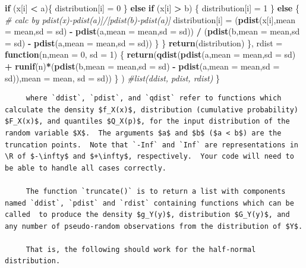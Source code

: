 \documentclass[
  9pt,
]{article}
\newenvironment{Shaded}{\begin{snugshade}}{\end{snugshade}}
\newcommand{\CommentTok}[1]{\textcolor[rgb]{0.56,0.35,0.01}{\textit{#1}}}
\newcommand{\ControlFlowTok}[1]{\textcolor[rgb]{0.13,0.29,0.53}{\textbf{#1}}}
\newcommand{\DataTypeTok}[1]{\textcolor[rgb]{0.13,0.29,0.53}{#1}}
\newcommand{\DecValTok}[1]{\textcolor[rgb]{0.00,0.00,0.81}{#1}}
\newcommand{\KeywordTok}[1]{\textcolor[rgb]{0.13,0.29,0.53}{\textbf{#1}}}
\newcommand{\NormalTok}[1]{#1}
\newcommand{\OperatorTok}[1]{\textcolor[rgb]{0.81,0.36,0.00}{\textbf{#1}}}
\newcommand{\StringTok}[1]{\textcolor[rgb]{0.31,0.60,0.02}{#1}}
\newcommand*{\R}{\textsf{R}$~$}
\begin{document}
\begin{Shaded}
\begin{Highlighting}[]
          \ControlFlowTok{if}\NormalTok{ (x[i] }\OperatorTok{<}\StringTok{ }\NormalTok{a)\{}
\NormalTok{            distribution[i] =}\StringTok{ }\DecValTok{0}
\NormalTok{          \} }\ControlFlowTok{else} \ControlFlowTok{if}\NormalTok{ (x[i] }\OperatorTok{>}\StringTok{ }\NormalTok{b) \{}
\NormalTok{            distribution[i] =}\StringTok{ }\DecValTok{1}
\NormalTok{          \}}
          \ControlFlowTok{else}\NormalTok{ \{}
            \CommentTok{\# calc by pdist(x){-}pdist(a)]/[pdist(b){-}pdist(a)]}
\NormalTok{            distribution[i] =}\StringTok{ }\NormalTok{(}\KeywordTok{pdist}\NormalTok{(x[i],}\DataTypeTok{mean =}\NormalTok{ mean,}\DataTypeTok{sd =}\NormalTok{ sd) }\OperatorTok{{-}}\StringTok{ }\KeywordTok{pdist}\NormalTok{(a,}\DataTypeTok{mean =}\NormalTok{ mean,}\DataTypeTok{sd =}\NormalTok{ sd)) }\OperatorTok{/}\StringTok{ }\NormalTok{(}\KeywordTok{pdist}\NormalTok{(b,}\DataTypeTok{mean =}\NormalTok{ mean,}\DataTypeTok{sd =}\NormalTok{ sd) }\OperatorTok{{-}}\StringTok{ }\KeywordTok{pdist}\NormalTok{(a,}\DataTypeTok{mean =}\NormalTok{ mean,}\DataTypeTok{sd =}\NormalTok{ sd))}
\NormalTok{          \}}
\NormalTok{        \}}
        \KeywordTok{return}\NormalTok{(distribution)}
\NormalTok{      \},}
      \DataTypeTok{rdist =} \ControlFlowTok{function}\NormalTok{(n,}\DataTypeTok{mean =} \DecValTok{0}\NormalTok{, }\DataTypeTok{sd =} \DecValTok{1}\NormalTok{) \{}
        \KeywordTok{return}\NormalTok{(}\KeywordTok{qdist}\NormalTok{(}\KeywordTok{pdist}\NormalTok{(a,}\DataTypeTok{mean =}\NormalTok{ mean,}\DataTypeTok{sd =}\NormalTok{ sd) }\OperatorTok{+}\StringTok{ }\KeywordTok{runif}\NormalTok{(n)}\OperatorTok{*}\NormalTok{(}\KeywordTok{pdist}\NormalTok{(b,}\DataTypeTok{mean =}\NormalTok{ mean,}\DataTypeTok{sd =}\NormalTok{ sd) }\OperatorTok{{-}}\StringTok{ }\KeywordTok{pdist}\NormalTok{(a,}\DataTypeTok{mean =}\NormalTok{ mean,}\DataTypeTok{sd =}\NormalTok{ sd)),}\DataTypeTok{mean =}\NormalTok{ mean, }\DataTypeTok{sd =}\NormalTok{ sd))}
\NormalTok{      \}}
\NormalTok{    )}
  \CommentTok{\#list(ddist, pdist, rdist)}
\NormalTok{  \}}
\end{Highlighting}
\end{Shaded}

\begin{verbatim}
     where `ddist`, `pdist`, and `qdist` refer to functions which  calculate the density $f_X(x)$, distribution (cumulative probability) $F_X(x)$, and quantiles $Q_X(p)$, for the input distribution of the random variable $X$.  The arguments $a$ and $b$ ($a < b$) are the truncation points.  Note that `-Inf` and `Inf` are representations in \R of $-\infty$ and $+\infty$, respectively.  Your code will need to be able to handle all cases correctly.
     
     The function `truncate()` is to return a list with components named `ddist`, `pdist` and `rdist` containing functions which can be called  to produce the density $g_Y(y)$, distribution $G_Y(y)$, and any number of pseudo-random observations from the distribution of $Y$.
     
     That is, the following should work for the half-normal distribution.
     
\end{verbatim}
\end{document}
